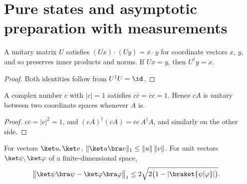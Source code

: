\section{Pure states and asymptotic preparation with measurements}
\label{sec:circuitplacement_asymptotic}

\begin{lemma}
    \label{lem:unitary_preserves_inner_product}
    \leanok
    A unitary matrix $U$ satisfies $\overline{(Ux)}\cdot(Uy)=\overline{x}\cdot y$
    for coordinate vectors $x$, $y$, and so preserves inner products and norms.
    If $Ux=y$, then $U^\dagger y=x$.
\end{lemma}

\begin{proof}\leanok
    Both identities follow from $U^\dagger U=\id$.
\end{proof}

\begin{lemma}
    \label{lem:unit_phase_scalar}
    \leanok
    A complex number $c$ with $\lvert c\rvert=1$ satisfies
    $c\overline{c}=\overline{c}c=1$. Hence $cA$ is unitary between two
    coordinate spaces whenever $A$ is.
\end{lemma}

\begin{proof}\leanok
    $c\overline{c}=\lvert c\rvert^2=1$, and
    $(cA)^\dagger(cA)=\overline{c}c\,A^\dagger A$, and similarly on the other
    side.
\end{proof}

\begin{lemma}
    \label{lem:qc_pure_state_trace_norm}
    \leanok
    For vectors $\ket u,\ket v$,
    $\lVert\ket u\bra v\rVert_1\leq\lVert u\rVert\,\lVert v\rVert$. For unit
    vectors $\ket\psi,\ket\varphi$ of a finite-dimensional space,
    \begin{align}
        \bigl\lVert\ket\psi\bra\psi-\ket\varphi\bra\varphi\bigr\rVert_1
         & \leq2\sqrt{2\bigl(1-\lvert\braket{\psi|\varphi}\rvert\bigr)}.\notag
    \end{align}
\end{lemma}


